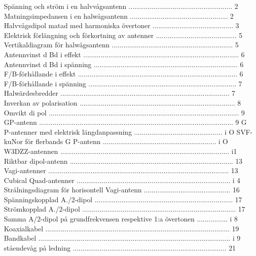 Spänning och ström i en halvvågsantenn ...................................................... 2
Matningsimpedansen i en halwågsantenn ................................................... 2
Halvvågsdipol matad med harmoniska övertoner .......................................... 3
Elektrisk förlängning och förkortning av antenner .......................................... 5
Vertikaldiagram för halwågsantenn ............................................................... 5
Antennvinst d Bd i effekt ................................................................................. 6
Antennvinst d Bd i spänning ........................................................................... 6
F/B-förhållande i effekt ................................................................................... 6
F/B-förhållande i spänning ............................................................................. 7
Halwärdesbredder ........................................................................................ 7
Inverkan av polarisation ................................................................................. 8
Omvikt di pol ................................................................................................... 9
GP-antenn ..................................................................................................... 9
G P-antenner med elektrisk längdanpassning .............................................. i O
SVF-kuNor för flerbands G P-antenn ........................................................... i O
W3DZZ-antennen ........................................................................................ i1
Riktbar dipol-antenn ..................................................................................... 13
Vagi-antenner .............................................................................................. 13
Cubical Quad-antenner ................................................................................ i 4
Strålningsdiagram för horisontell Vagi-antenn ............................................. 16
Spänningskopplad A./2-dipol ........................................................................ 17
Strömkopplad A./2-dipol ................................................................................ 17
Samma A/2-dipol på grundfrekvensen respektive 1:a övertonen ................ i 8
Koaxialkabel ................................................................................................ 19
Bandkabel .................................................................................................... i 9
ståendevåg på ledning ................................................................................ 21
